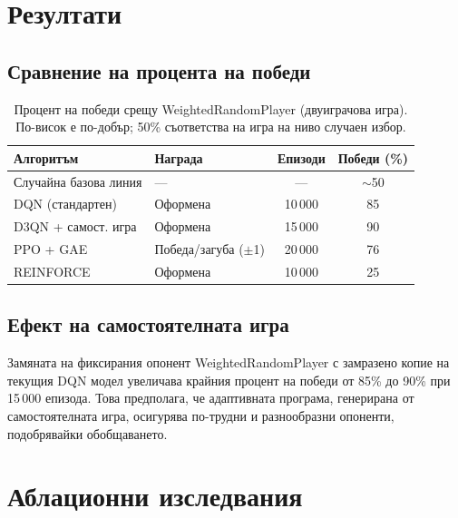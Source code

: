\documentclass[11pt,a4paper]{article}
\begin{document}
\section{Резултати}

\subsection{Сравнение на процента на победи}
\begin{table}[H]
\centering
\caption{Процент на победи срещу WeightedRandomPlayer (двуиграчова игра).
         По-висок е по-добър; 50\% съответства на игра на ниво случаен избор.}
\label{tab:results}
\begin{tabular}{llcc}
\toprule
Алгоритъм & Награда & Епизоди & Победи (\%) \\
\midrule
Случайна базова линия    & ---               & ---     & $\sim$50 \\
DQN (стандартен)         & Оформена          & 10\,000 & 85 \\
D3QN + самост. игра      & Оформена          & 15\,000 & 90 \\
PPO + GAE                & Победа/загуба ($\pm$1) & 20\,000 & 76 \\
REINFORCE                & Оформена          & 10\,000 & 25 \\
\bottomrule
\end{tabular}
\end{table}

\subsection{Ефект на самостоятелната игра}

Замяната на фиксирания опонент WeightedRandomPlayer с замразено копие на
текущия DQN модел увеличава крайния процент на победи от 85\% до 90\% при
15\,000 епизода. Това предполага, че адаптивната програма, генерирана от
самостоятелната игра, осигурява по-трудни и разнообразни опоненти, подобрявайки
обобщаването.

\section{Аблационни изследвания}
\end{document}
